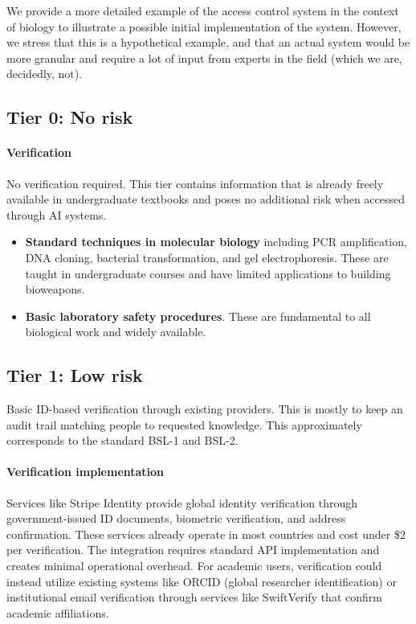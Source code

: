 \documentclass{article}
\theoremstyle{plain}
\theoremstyle{definition}
\theoremstyle{remark}
\begin{document}
We provide a more detailed example of the access control system in the context of biology to illustrate a possible initial implementation of the system.
However, we stress that this is a hypothetical example, and that an actual system would be more granular and require a lot of input from experts in the field (which we are, decidedly, not).

\subsection{Tier 0: No risk}

\paragraph{Verification} No verification required. This tier contains information that is already freely available in undergraduate textbooks and poses no additional risk when accessed through AI systems.

\begin{itemize}
  \item \textbf{Standard techniques in molecular biology} including PCR amplification, DNA cloning, bacterial transformation, and gel electrophoresis. These are taught in undergraduate courses and have limited applications to building bioweapons.
  \item \textbf{Basic laboratory safety procedures}. These are fundamental to all biological work and widely available.
\end{itemize}

\subsection{Tier 1: Low risk}

Basic ID-based verification through existing providers. This is mostly to keep an audit trail matching people to requested knowledge. This approximately corresponds to the standard BSL-1 and BSL-2.

\paragraph{Verification implementation} Services like Stripe Identity provide global identity verification through government-issued ID documents, biometric verification, and address confirmation. These services already operate in most countries and cost under \$2 per verification. The integration requires standard API implementation and creates minimal operational overhead. For academic users, verification could instead utilize existing systems like ORCID (global researcher identification) or institutional email verification through services like SwiftVerify that confirm academic affiliations.
\end{document}
